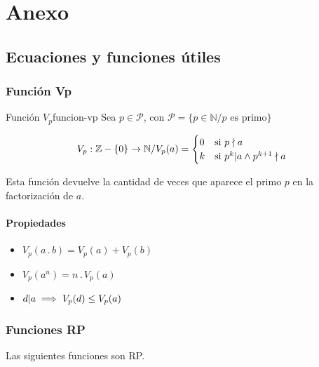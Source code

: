 \chapter{Anexo}

\section{Ecuaciones y funciones útiles}

\subsection{Función Vp}

\begin{definicion}{Función $V_p$}{funcion-vp}
    Sea $p \in \mathcal{P}$, con 
    $\mathcal{P} = \{ p \in \mathbb{N} / p \text{ es primo} \}$

    \medskip

    \begin{gather*}
        V_p : \mathbb{Z} - \{ 0 \} \to \mathbb{N} /
        V_p (a) =
        \begin{cases}
            0 & \text{si } \notdivides{p}{a} \\
            k & \text{si } \divides{p^k}{a} \wedge \notdivides{p^{k+1}}{a}\\
        \end{cases}
    \end{gather*}
\end{definicion}

Esta función devuelve la cantidad de veces que aparece el primo $p$ en la 
factorización de $a$.

\subsubsection{Propiedades}
\begin{itemize}
    \item $V_p (a \, . \, b) = V_p(a) + V_p(b)$
    \item $V_p (a^n) = n \, . \, V_p(a)$
    \item $\divides{d}{a} \implies V_p (d) \leq V_p (a)$
\end{itemize}

\subsection{Funciones RP}

Las siguientes funciones son RP.

